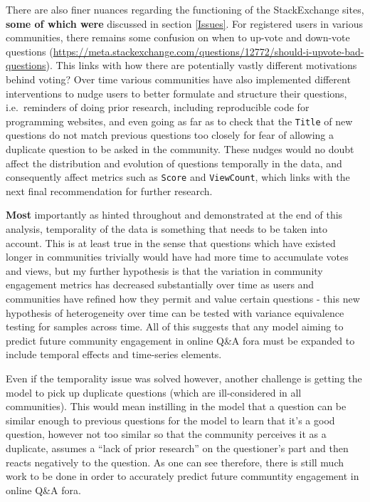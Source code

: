 \documentclass[11pt,preprint, authoryear]{article}
\numberwithin{equation}{section}
\begin{document}
There are also finer nuances regarding the functioning of the
StackExchange sites, \textbf{some of which were} discussed in section
\ref{Issues}. For registered users in various communities, there remains
some confusion on when to up-vote and down-vote questions
(\url{https://meta.stackexchange.com/questions/12772/should-i-upvote-bad-questions}).
This links with how there are potentially vastly different motivations
behind voting? Over time various communities have also implemented
different interventions to nudge users to better formulate and structure
their questions, i.e.~reminders of doing prior research, including
reproducible code for programming websites, and even going as far as to
check that the \texttt{Title} of new questions do not match previous
questions too closely for fear of allowing a duplicate question to be
asked in the community. These nudges would no doubt affect the
distribution and evolution of questions temporally in the data, and
consequently affect metrics such as \texttt{Score} and
\texttt{ViewCount}, which links with the next final recommendation for
further research.

\textbf{Most} importantly as hinted throughout and demonstrated at the
end of this analysis, temporality of the data is something that needs to
be taken into account. This is at least true in the sense that questions
which have existed longer in communities trivially would have had more
time to accumulate votes and views, but my further hypothesis is that
the variation in community engagement metrics has decreased
substantially over time as users and communities have refined how they
permit and value certain questions - this new hypothesis of
heterogeneity over time can be tested with variance equivalence testing
for samples across time. All of this suggests that any model aiming to
predict future community engagement in online Q\&A fora must be expanded
to include temporal effects and time-series elements.

Even if the temporality issue was solved however, another challenge is
getting the model to pick up duplicate questions (which are
ill-considered in all communities). This would mean instilling in the
model that a question can be similar enough to previous questions for
the model to learn that it's a good question, however not too similar so
that the community perceives it as a duplicate, assumes a ``lack of
prior research'' on the questioner's part and then reacts negatively to
the question. As one can see therefore, there is still much work to be
done in order to accurately predict future communtity engagement in
online Q\&A fora.
\end{document}
